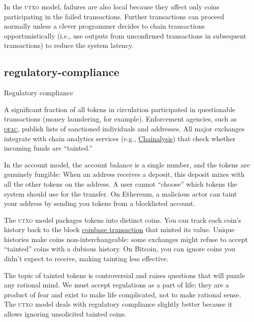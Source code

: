 \documentclass{article}
\begin{document}
In the \textsc{utxo} model, failures are also local because they affect only coins participating in the failed transactions.
Further transactions can proceed normally unless a clever programmer decides to chain transactions opportunistically (i.e., use outputs from unconfirmed transactions in subsequent transactions) to reduce the system latency.

\subsection{regulatory-compliance}{Regulatory compliance}

A significant fraction of all tokens in circulation participated in questionable transactions (money laundering, for example).
Enforcement agencies, such as \href{https://en.wikipedia.org/wiki/Office_of_Foreign_Assets_Control}{\textsc{ofac}}, publish lists of sanctioned individuals and addresses.
All major exchanges integrate with chain analytics services (e.g., \href{https://www.chainalysis.com/}{Chainalysis}) that check whether incoming funds are ``tainted.''

In the account model, the account balance is a single number, and the tokens are genuinely fungible:
When an address receives a deposit, this deposit mixes with all the other tokens on the address.
A user cannot ``choose'' which tokens the system should use for the transfer.
On Ethereum, a malicious actor can taint your address by sending you tokens from a blocklisted account.

The \textsc{utxo} model packages tokens into distinct coins.
You can track each coin's history back to the block \href{https://en.bitcoin.it/wiki/Coinbase}{coinbase transaction} that minted its value.
Unique histories make coins non-interchangeable: some exchanges might refuse to accept ``tainted'' coins with a dubious history.
On Bitcoin, you can ignore coins you didn't expect to receive, making tainting less effective.

The topic of tainted tokens is controversial and raises questions that will puzzle any rational mind.
We must accept regulations as a part of life; they are a product of fear and exist to make life complicated, not to make rational sense.
The \textsc{utxo} model deals with regulatory compliance slightly better because it allows ignoring unsolicited tainted coins.
\end{document}
